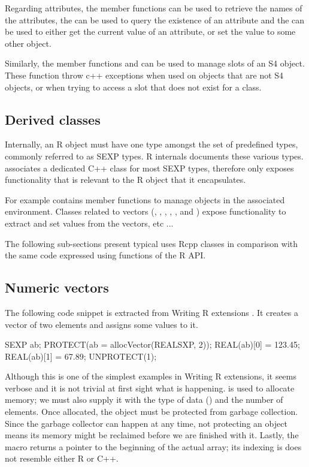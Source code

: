 Regarding attributes, the member functions 
 can be used to retrieve the names of the attributes, 
the  can be used to query the existence of an attribute and 
the  can be used to either get the current value of an 
attribute, or set the value to some other object.

Similarly, the member functions  and 
can be used to manage slots of an S4 object. These function throw 
c++ exceptions when used on objects that are not S4 objects, or when 
trying to access a slot that does not exist for a class.

\subsection{Derived classes}

Internally, an R object must have one type amongst the set of 
predefined types, commonly referred to as SEXP types. R internals
\citep{R:ints} documents these various types. 
 associates a dedicated C++ class for most SEXP types, 
therefore only exposes functionality that is relevant to the R object
that it encapsulates.

For example  contains 
member functions to manage objects in the associated environment. 
Classes related to vectors (, , 
, , , 
 and ) expose functionality
to extract and set values from the vectors, etc ...

The following sub-sections present typical uses Rcpp classes in
comparison with the same code expressed using functions of the R API.

\subsection{Numeric vectors}

The following code snippet is extracted from Writing R extensions
\citep{R:exts}. It creates a  vector of two elements 
and assigns some values to it. 

\begin{example}
SEXP ab;
PROTECT(ab = allocVector(REALSXP, 2));
REAL(ab)[0] = 123.45;
REAL(ab)[1] = 67.89;
UNPROTECT(1);
\end{example}

Although this is one of the simplest examples in Writing R extensions, 
it seems verbose and it is not trivial at first sight what is happening.
 is used to allocate memory; we must also supply it with
the type of data () and the number of elements.  Once
allocated, the  object must be protected from garbage
collection. Since the garbage collector can happen at any time, not
protecting an object means its memory might be reclaimed before we are
finished with it. Lastly, the  macro returns a pointer to the
beginning of the actual array; its indexing is does not resemble either R or
C++.


